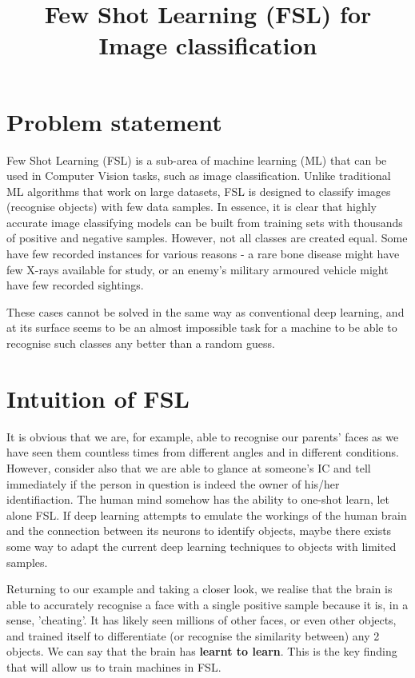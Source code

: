 \documentclass[12pt, letterpaper]{article}
\title{Few Shot Learning (FSL) for Image classification}
\begin{document}
\maketitle

\section{Problem statement}
    Few Shot Learning (FSL) is a sub-area of machine learning (ML) that can be used in Computer Vision  tasks, such as image classification. Unlike traditional ML algorithms that work on large datasets, FSL is designed to classify images (recognise objects) with few data samples. In essence, it is clear that highly accurate image classifying models can be built from training sets with thousands of positive and negative samples. However, not all classes are created equal. Some have few recorded instances for various reasons - a rare bone disease might have few X-rays available for study, or an enemy's military armoured vehicle might have few recorded sightings. 

    These cases cannot be solved in the same way as conventional deep learning, and at its surface seems to be an almost impossible task for a machine to be able to recognise such classes any better than a random guess. 

\section{Intuition of FSL}

    It is obvious that we are, for example, able to recognise our parents' faces as we have seen them countless times from different angles and in different conditions. However, consider also that we are able to glance at someone's IC and tell immediately if the person in question is indeed the owner of his/her identifiaction. The human mind somehow has the ability to one-shot learn, let alone FSL. If deep learning attempts to emulate the workings of the human brain and the connection between its neurons to identify objects, maybe there exists some way to adapt the current deep learning techniques to objects with limited samples.

    Returning to our example and taking a closer look, we realise that the brain is able to accurately recognise a face with a single positive sample because it is, in a sense, 'cheating'. It has likely seen millions of other faces, or even other objects, and trained itself to differentiate (or recognise the similarity between) any 2 objects. We can say that the brain has \textbf{learnt to learn}. This is the key finding that will allow us to train machines in FSL.
\end{document}
